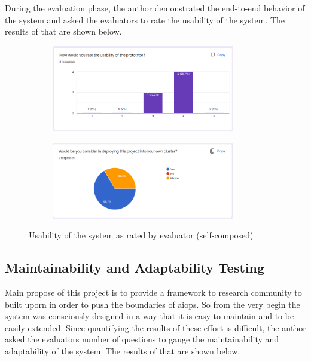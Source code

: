 \noindent During the evaluation phase, the author demonstrated the end-to-end behavior of the system and asked the evaluators to rate the usability of the system. The results of that are shown below.


\begin{figure}[H]
    \centering
    \begin{subfigure}[bH]{0.49\textwidth}
        \centering
        \includegraphics[width=8cm]{assets/testing/usability.png}
    \end{subfigure}
    \hfill
    \begin{subfigure}[bH]{0.49\textwidth}
        \centering
        \includegraphics[width=8cm]{assets/testing/use-or-not.png}
    \end{subfigure}
    \hfill
    \caption{Usability of the system as rated by evaluator (self-composed)}
\end{figure}




\subsection{Maintainability and Adaptability Testing}

Main propose of this project is to provide a framework to research community to built uporn in order to push the boundaries of \ac{aiops}. So from the very begin the system was consciously designed in a way that it is easy to maintain and to be easily extended. Since quantifying the results of these effort is difficult, the author asked the evaluators number of questions to gauge the maintainability and adaptability of the system. The results of that are shown below.

